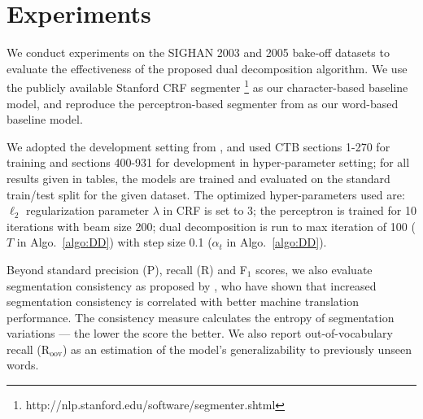 \section{Experiments}


We conduct experiments on the SIGHAN 2003 \cite{Sproat:2003:SIGHAN} and 2005 \cite{Emerson:2005:SIGHAN} bake-off datasets to evaluate the effectiveness of the proposed dual decomposition algorithm. We use the publicly available Stanford CRF segmenter \cite{Tseng:2005:SIGHAN}\footnote{http://nlp.stanford.edu/software/segmenter.shtml} as our character-based baseline model, and reproduce the perceptron-based segmenter from  as our word-based baseline model.

We adopted the development setting from \cite{Zhang:2007:ACL}, and used CTB sections 1-270 for training and sections 400-931 for development in hyper-parameter setting; for all results given in tables, the models are trained and evaluated on the standard train/test split for the given dataset. The optimized hyper-parameters used are: $\ell_{2}$ regularization parameter $\lambda$ in CRF is set to $3$; the perceptron is trained for 10 iterations with beam size 200; dual decomposition is run to max iteration of 100 ($T$ in Algo.~\ref{algo:DD}) with step size 0.1 ($\alpha_t$ in Algo.~\ref{algo:DD}). 

Beyond standard precision (P), recall (R) and F$_1$ scores, we also evaluate segmentation consistency as proposed by \cite{Chang:2008:ACL}, who have shown that increased segmentation consistency is correlated with better machine translation performance. The consistency measure calculates the entropy of segmentation variations --- the lower the score the better. We also report out-of-vocabulary recall (R$_{\mathrm{oov}}$) as an estimation of the model's generalizability to previously unseen words.

